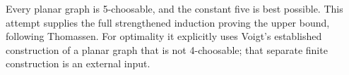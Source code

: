 Every planar graph is 5-choosable, and the constant five is best possible. This attempt supplies the full strengthened induction proving the upper bound, following Thomassen. For optimality it explicitly uses Voigt's established construction of a planar graph that is not 4-choosable; that separate finite construction is an external input.
